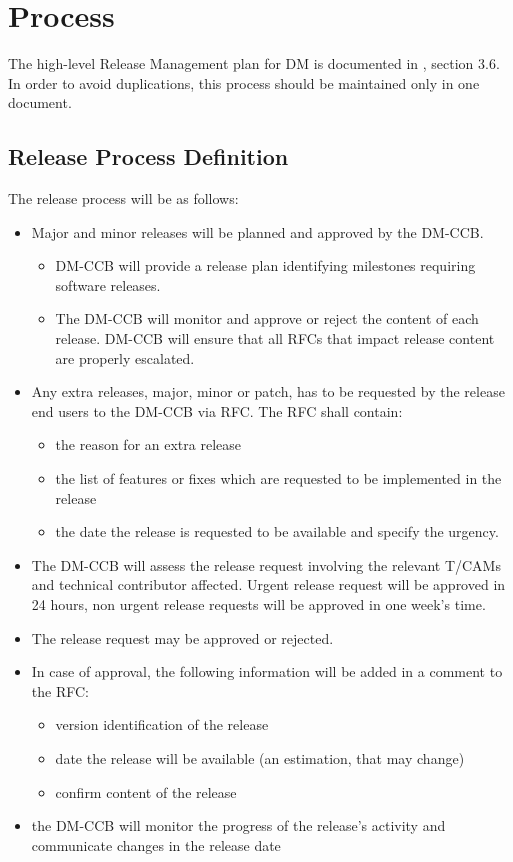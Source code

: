 \section{Process} \label{sec:process}


The high-level Release Management plan for \gls{DM} is documented in , section 3.6. 
In order to avoid duplications, this process should be maintained only in one document.


\subsection{Release Process Definition}

The release process will be as follows:

\begin{itemize}
\item Major and minor releases will be planned and approved by the DM-CCB.
\begin{itemize}
  \item  DM-CCB will provide  a release plan identifying  milestones requiring software releases.
  \item The DM-CCB will monitor and approve or reject the content of each release. DM-CCB will ensure that  all RFCs that impact  release content are properly escalated.
\end{itemize}
\item Any extra releases, major, minor or patch, has to be requested by the release end users to the DM-CCB via \gls{RFC}. The \gls{RFC} shall contain:
\begin{itemize}
  \item the reason for an extra release
  \item the list of features or fixes which are requested to be implemented in the release
  \item the date the release is requested to be available and specify the urgency.
\end{itemize}
\item The DM-CCB will assess the release request involving the relevant T/CAMs and technical contributor affected.
Urgent release request will be approved in 24 hours, non urgent release requests will be approved in one week's time.
\item The release request may be approved or rejected.
\item In case of approval, the following information will be added in a comment to the RFC:
\begin{itemize}
  \item version identification of the release
  \item date the release will be available (an estimation, that may change)
  \item confirm content of the release
\end{itemize}
\item the DM-CCB will monitor the progress of the release's activity and communicate changes in the release date
\end{itemize}



